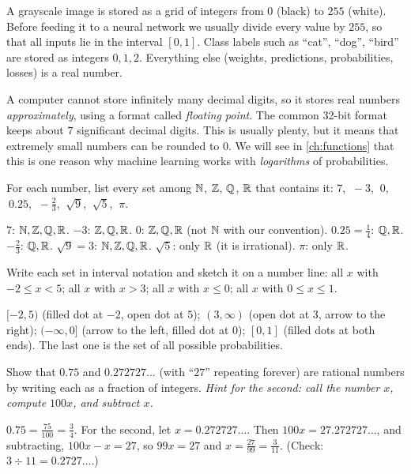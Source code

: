 \begin{mlnote}
A grayscale image is stored as a grid of integers from $0$ (black) to $255$
(white). Before feeding it to a neural network we usually divide every value
by $255$, so that all inputs lie in the interval $[0,1]$. Class labels such as
``cat'', ``dog'', ``bird'' are stored as integers $0,1,2$. Everything else
(weights, predictions, probabilities, losses) is a real number.

A computer cannot store infinitely many decimal digits, so it stores real
numbers \emph{approximately}, using a format called \emph{floating point}. The
common 32-bit format keeps about $7$ significant decimal digits. This is
usually plenty, but it means that extremely small numbers can be rounded to
$0$. We will see in \cref{ch:functions} that this is one reason why machine
learning works with \emph{logarithms} of probabilities.
\end{mlnote}

\sectionexercises

\begin{exercise}
For each number, list every set among $\mathbb{N}$, $\mathbb{Z}$, $\mathbb{Q}$, $\mathbb{R}$ that contains it:
$7$, $\ -3$, $\ 0$, $\ 0.25$, $\ -\tfrac23$, $\ \sqrt9$, $\ \sqrt5$, $\ \pi$.
\end{exercise}
\begin{solution}
$7$: $\mathbb{N},\mathbb{Z},\mathbb{Q},\mathbb{R}$. \quad $-3$: $\mathbb{Z},\mathbb{Q},\mathbb{R}$. \quad $0$: $\mathbb{Z},\mathbb{Q},\mathbb{R}$ (not $\mathbb{N}$
with our convention). \quad $0.25=\tfrac14$: $\mathbb{Q},\mathbb{R}$. \quad $-\tfrac23$:
$\mathbb{Q},\mathbb{R}$. \quad $\sqrt9 = 3$: $\mathbb{N},\mathbb{Z},\mathbb{Q},\mathbb{R}$. \quad $\sqrt5$: only $\mathbb{R}$ (it is
irrational). \quad $\pi$: only $\mathbb{R}$.
\end{solution}

\begin{exercise}
Write each set in interval notation and sketch it on a number line:
all $x$ with $-2 \le x < 5$; all $x$ with $x > 3$; all $x$ with $x \le 0$; all
$x$ with $0 \le x \le 1$.
\end{exercise}
\begin{solution}
$[-2,5)$ (filled dot at $-2$, open dot at $5$); $(3,\infty)$ (open dot at
$3$, arrow to the right); $(-\infty,0]$ (arrow to the left, filled dot at $0$);
$[0,1]$ (filled dots at both ends). The last one is the set of all possible
probabilities.
\end{solution}

\begin{exercise}
Show that $0.75$ and $0.272727\ldots$ (with ``$27$'' repeating forever) are
rational numbers by writing each as a fraction of integers. \emph{Hint for the
second: call the number $x$, compute $100x$, and subtract $x$.}
\end{exercise}
\begin{solution}
$0.75 = \tfrac{75}{100} = \tfrac34$. For the second, let
$x = 0.272727\ldots$. Then $100x = 27.272727\ldots$, and subtracting,
$100x - x = 27$, so $99x = 27$ and $x = \tfrac{27}{99} = \tfrac{3}{11}$.
(Check: $3 \div 11 = 0.2727\ldots$.)
\end{solution}

